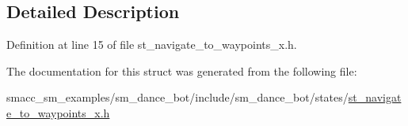\subsection{Detailed Description}


Definition at line 15 of file st\+\_\+navigate\+\_\+to\+\_\+waypoints\+\_\+x.\+h.



The documentation for this struct was generated from the following file\+:\begin{DoxyCompactItemize}
\item 
smacc\+\_\+sm\+\_\+examples/sm\+\_\+dance\+\_\+bot/include/sm\+\_\+dance\+\_\+bot/states/\hyperlink{st__navigate__to__waypoints__x_8h}{st\+\_\+navigate\+\_\+to\+\_\+waypoints\+\_\+x.\+h}\end{DoxyCompactItemize}
